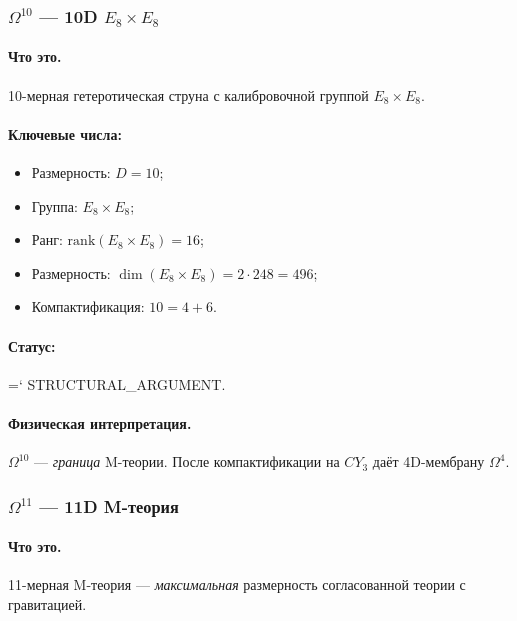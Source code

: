\documentclass[11pt,a4paper]{article}
\newcommand{\CY}{CY_3}
\newcommand{\Om}{\Omega^4}
\newcommand{\Omt}{\Omega^{10}}
\newcommand{\Ome}{\Omega^{11}}
\renewcommand{\texttt}[1]{{\ttfamily\hyphenchar\font=`\- #1}}
\theoremstyle{definition}
\begin{document}
\subsubsection{$\Omt$ --- 10D $E_8 \times E_8$}

\paragraph{Что это.}
10-мерная гетеротическая струна с калибровочной группой 
$E_8 \times E_8$.

\paragraph{Ключевые числа:}
\begin{itemize}
    \item Размерность: $D = 10$;
    \item Группа: $E_8 \times E_8$;
    \item Ранг: $\mathrm{rank}(E_8 \times E_8) = 16$;
    \item Размерность: $\dim(E_8 \times E_8) = 2 \cdot 248 = 496$;
    \item Компактификация: $10 = 4 + 6$.
\end{itemize}

\paragraph{Статус:} \texttt{STRUCTURAL\_ARGUMENT}.

\paragraph{Физическая интерпретация.}
$\Omt$ — \emph{граница} M-теории. После компактификации 
на $\CY$ даёт 4D-мембрану $\Om$.

\subsubsection{$\Ome$ --- 11D M-теория}

\paragraph{Что это.}
11-мерная M-теория — \emph{максимальная} размерность 
согласованной теории с гравитацией.
\end{document}
